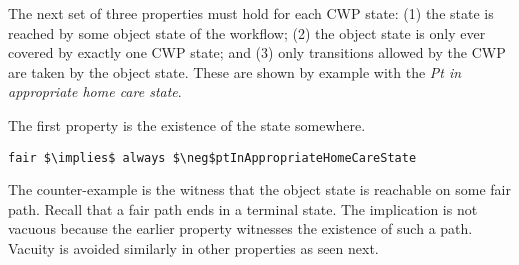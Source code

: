 \begin{comment}
The meaning of \emph{eventually} is that at some point in the future of the path currently being considered, there exists a state, where the expression \texttt{(ptDischargedState || ptExpiredState)} is true.
The property to verify is expressed as an invariant using the \emph{always} operator.
This invariant \emph{should not hold} in the workflow model (e.g., it should result in a verification error). 

The very nature of LTL makes existential properties awkward to express in that they are accomplished by writing a property that should not hold.
The counter-example to the property showing where it does hold is a \emph{witness} to the existential property.
Claiming that the eventuality \texttt{fair} never holds in any state in any path of the workflow means that if it does hold somewhere (e.g., exists), then the model checker will find a witness attesting as much.
Anytime a property is used on the left-hand side of an implication, then such an existential property should be verified.
More on this requirement later.

The term \emph{fair} is a reference to the over-approximating nature of the workflow model.
Indeed, in considering the workflow in \figref{fig:bpmn}, it is possible that a patient is never discharged or that the patient never expires.
Such a behavior is \emph{not fair} because it is not emblematic of the real world---patients eventually are discharged or expire.
As such, the property proves the existence of paths in the workflow that end in the goal states, and this same property is used later to restrict verification to only those paths that end in one of goal states thereby excluding from consideration, in verification, any infinite workflow behaviors where the patient never recovers or expires.
\end{comment}

The next set of three properties must hold for each CWP state:
(1) the state is reached by some object state of the workflow;
(2) the object state is only ever covered by exactly one CWP state;
and (3) only transitions allowed by the CWP are taken by the object state.
These are shown by example with the \emph{Pt in appropriate home care state}.

The first property is the existence of the state somewhere.
%
{\small
\begin{lstlisting}[style=myPromela,mathescape=true]
fair $\implies$ always $\neg$ptInAppropriateHomeCareState
\end{lstlisting}
}
%
\noindent The counter-example is the witness that the object state is reachable on some fair path.
Recall that a fair path ends in a terminal state.
The implication is not vacuous because the earlier property witnesses the existence of such a path.
Vacuity is avoided similarly in other properties as seen next.

